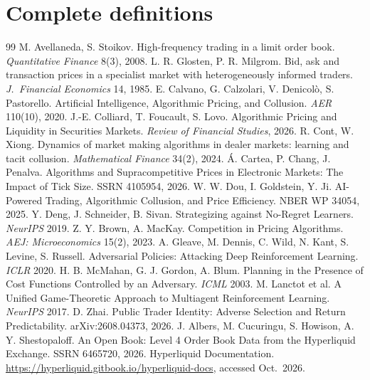\documentclass[11pt]{article}
\begin{document}
\appendix
\renewcommand{\thesection}{\Alph{section}}
\section{Complete definitions}\label{app:glossary}
\let\oldsection\section
\renewcommand{\section}[1]{}  %

\let\section\oldsection

\begin{thebibliography}{99}\small
{} M. Avellaneda, S. Stoikov. High-frequency trading in a limit order book. \emph{Quantitative Finance} 8(3), 2008.
 L. R. Glosten, P. R. Milgrom. Bid, ask and transaction prices in a specialist market with heterogeneously informed traders. \emph{J.\ Financial Economics} 14, 1985.
 E. Calvano, G. Calzolari, V. Denicol\`o, S. Pastorello. Artificial Intelligence, Algorithmic Pricing, and Collusion. \emph{AER} 110(10), 2020.
 J.-E. Colliard, T. Foucault, S. Lovo. Algorithmic Pricing and Liquidity in Securities Markets. \emph{Review of Financial Studies}, 2026.
 R. Cont, W. Xiong. Dynamics of market making algorithms in dealer markets: learning and tacit collusion. \emph{Mathematical Finance} 34(2), 2024.
 \'A. Cartea, P. Chang, J. Penalva. Algorithms and Supracompetitive Prices in Electronic Markets: The Impact of Tick Size. SSRN 4105954, 2026.
 W. W. Dou, I. Goldstein, Y. Ji. AI-Powered Trading, Algorithmic Collusion, and Price Efficiency. NBER WP 34054, 2025.
 Y. Deng, J. Schneider, B. Sivan. Strategizing against No-Regret Learners. \emph{NeurIPS} 2019.
 Z. Y. Brown, A. MacKay. Competition in Pricing Algorithms. \emph{AEJ: Microeconomics} 15(2), 2023.
 A. Gleave, M. Dennis, C. Wild, N. Kant, S. Levine, S. Russell. Adversarial Policies: Attacking Deep Reinforcement Learning. \emph{ICLR} 2020.
 H. B. McMahan, G. J. Gordon, A. Blum. Planning in the Presence of Cost Functions Controlled by an Adversary. \emph{ICML} 2003.
 M. Lanctot et al. A Unified Game-Theoretic Approach to Multiagent Reinforcement Learning. \emph{NeurIPS} 2017.
 D. Zhai. Public Trader Identity: Adverse Selection and Return Predictability. arXiv:2608.04373, 2026.
 J. Albers, M. Cucuringu, S. Howison, A. Y. Shestopaloff. An Open Book: Level 4 Order Book Data from the Hyperliquid Exchange. SSRN 6465720, 2026.
 Hyperliquid Documentation. \url{https://hyperliquid.gitbook.io/hyperliquid-docs}, accessed Oct.\ 2026.
\end{thebibliography}
\end{document}
